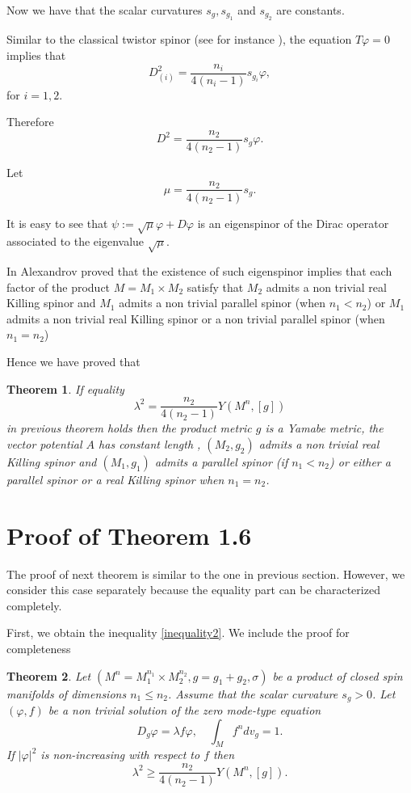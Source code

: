 \documentclass[11pt]{amsart}
\newtheorem{theorem}{Theorem}[section]
\theoremstyle{plain}
\numberwithin{equation}{section}
\theoremstyle{plain}
\begin{document}
Now we have that the scalar curvatures  $s_g,s_{g_1}$ and $s_{g_2}$ are constants.

Similar to the classical twistor spinor (see for instance \cite{Baum}), the equation $T\varphi=0$ implies that $$D^2_{(i)}=\frac{n_i}{4(n_i-1)}s_{g_i}\varphi,$$
for $i=1,2$.

Therefore $$D^2=\frac{n_2}{4(n_2-1)}s_{g}\varphi.$$

Let $$\mu=\frac{n_2}{4(n_2-1)}s_{g}.$$

It is easy to see that $\psi:=\sqrt{\mu}\varphi+D\varphi$ is an eigenspinor of the Dirac operator associated to the eigenvalue $\sqrt{\mu}$.  

In \cite{Alex} Alexandrov proved that the existence of such eigenspinor implies that each factor of the product $M=M_1\times M_2$  satisfy that $M_2$ admits a non trivial real Killing spinor and $M_1$ admits a non trivial parallel spinor (when $n_1<n_2$) or $M_1$ admits a non trivial real Killing spinor or a non trivial parallel spinor (when $n_1=n_2$)
 
Hence we have proved that 
\begin{theorem}
If equality $$\lambda^2=\frac{n_2}{4(n_2-1)}Y(M^n,[g])$$ in previous theorem holds then the product metric $g$ is a Yamabe metric, the vector potential $A$ has constant length , $(M_2,g_2)$ admits a non trivial real Killing spinor and $(M_1,g_1)$ admits a parallel spinor (if $n_1<n_2$) or either a parallel spinor or a real Killing spinor when $n_1=n_2$.
\end{theorem}


\section{Proof of Theorem 1.6}
The proof of next theorem is similar to the one in previous section. However, we consider this case separately because the equality part can be characterized completely.

First, we obtain the inequality \eqref{inequality2}. We include the proof for completeness
\begin{theorem}
Let $(M^n=M_1^{n_1}\times M_2^{n_2},g=g_1+g_2,\sigma)$ be a product of closed spin manifolds of dimensions $n_1\leq n_2$. Assume that the scalar curvature $s_g>0$. Let $(\varphi,f)$ be a non trivial solution of the zero mode-type equation $$D_g\varphi=\lambda f\varphi,\quad\int_M f^ndv_g=1. $$
If $|\varphi|^2$ is non-increasing with respect to $f$ then $$\lambda^2\geq \frac{n_2}{4(n_2-1)}Y(M^n,[g]).$$
\end{theorem} 
\end{document}
